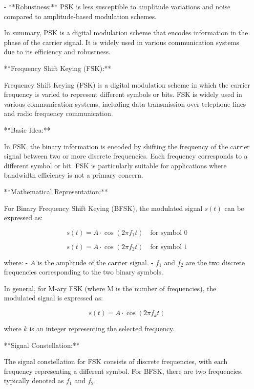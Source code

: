 \documentclass[../../../../DMCC-My-Notebook]{subfiles}
\begin{document}
	- **Robustness:** PSK is less susceptible to amplitude variations and noise compared to amplitude-based modulation schemes.
	
	In summary, PSK is a digital modulation scheme that encodes information in the phase of the carrier signal. It is widely used in various communication systems due to its efficiency and robustness.
	
	
	
	
	
	
	
	**Frequency Shift Keying (FSK):**
	
	Frequency Shift Keying (FSK) is a digital modulation scheme in which the carrier frequency is varied to represent different symbols or bits. FSK is widely used in various communication systems, including data transmission over telephone lines and radio frequency communication.
	
	**Basic Idea:**
	
	In FSK, the binary information is encoded by shifting the frequency of the carrier signal between two or more discrete frequencies. Each frequency corresponds to a different symbol or bit. FSK is particularly suitable for applications where bandwidth efficiency is not a primary concern.
	
	**Mathematical Representation:**
	
	For Binary Frequency Shift Keying (BFSK), the modulated signal \(s(t)\) can be expressed as:
	
	\[ s(t) = A \cdot \cos(2\pi f_1 t) \quad \text{for symbol } 0 \]
	
	\[ s(t) = A \cdot \cos(2\pi f_2 t) \quad \text{for symbol } 1 \]
	
	where:
	- \( A \) is the amplitude of the carrier signal.
	- \( f_1 \) and \( f_2 \) are the two discrete frequencies corresponding to the two binary symbols.
	
	In general, for M-ary FSK (where M is the number of frequencies), the modulated signal is expressed as:
	
	\[ s(t) = A \cdot \cos(2\pi f_k t) \]
	
	where \( k \) is an integer representing the selected frequency.
	
	**Signal Constellation:**
	
	The signal constellation for FSK consists of discrete frequencies, with each frequency representing a different symbol. For BFSK, there are two frequencies, typically denoted as \(f_1\) and \(f_2\).
	
\end{document}
